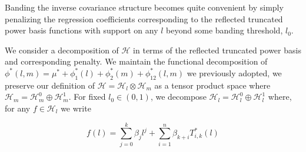 \documentclass[12pt]{article}
\begin{document}
Banding the inverse covariance structure becomes quite convenient by simply penalizing the regression coefficients corresponding to the reflected truncated power basis functions with support on any $l$ beyond some banding threshold, $l_0$. 

We consider a decomposition of $\mathcal{H}$ in terms of the reflected truncated power basis and corresponding penalty. We maintain the functional decomposition of $\phi^*\left(l,m\right) = \mu^* + \phi^*_1\left(l\right) + \phi^*_2\left(m\right) + \phi^*_{12}\left(l,m\right)$ we previously adopted, we preserve our definition of $\mathcal{H} = \mathcal{H}_l\otimes \mathcal{H}_m$ as a tensor product space where $\mathcal{H}_m = \mathcal{H}_m^0 \oplus \mathcal{H}_m^1$. For fixed $l_0\in\left(0,1\right)$, we decompose $\mathcal{H}_l = \mathcal{H}_l^0 \oplus \mathcal{H}_l^1$ where, for any $f \in \mathcal{H}_l$ we write

\begin{equation}
f\left(l\right) = \sum_{j=0}^k \beta_j l^j + \sum_{i=1}^n \beta_{k+i} T^*_{i,k}\left(l\right) \label{polynomial_expansion}
\end{equation} 
\end{document}
